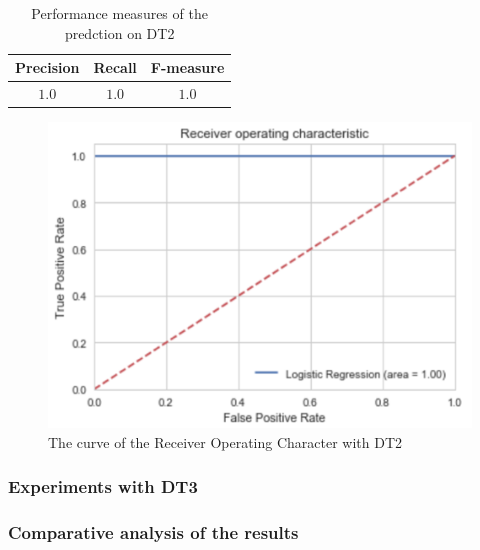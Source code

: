 \begin{table}[h]
\centering
\begin{tabular}{ccc}
\textbf{Precision} & \textbf{Recall} & \textbf{F-measure}\\
\toprule
$1.0$ & $1.0$ & $1.0$ \\
\bottomrule
\end{tabular}
\caption{Performance measures of the predction on DT2}\label{perf-measures-dt2}
\end{table}

\begin{figure}
\centering
\includegraphics[width=.6\textwidth]{images/curve_roc_dt2}
\caption{The curve of the Receiver Operating Character with DT2}\label{roc_dt2}
\end{figure}
\subsubsection{Experiments with DT3}
\subsubsection{Comparative analysis of the results}

